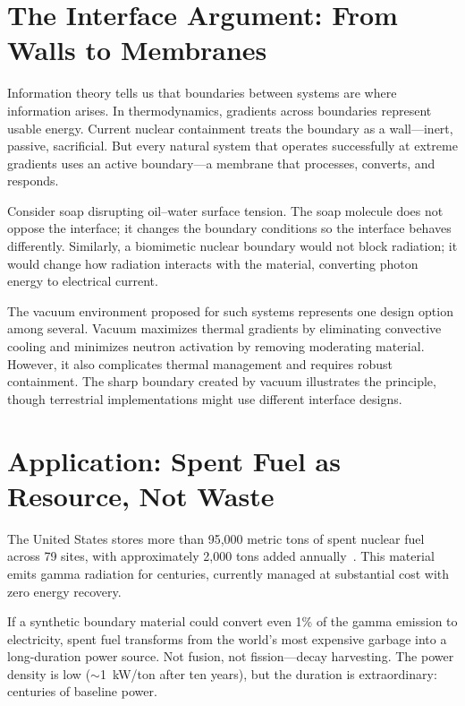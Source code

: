 \documentclass[12pt]{article}
\begin{document}
\section{The Interface Argument: From Walls to Membranes}

Information theory tells us that boundaries between systems are where information arises.
In thermodynamics, gradients across boundaries represent usable energy. Current nuclear
containment treats the boundary as a wall---inert, passive, sacrificial. But every
natural system that operates successfully at extreme gradients uses an active
boundary---a membrane that processes, converts, and responds.

Consider soap disrupting oil--water surface tension. The soap molecule does not oppose
the interface; it changes the boundary conditions so the interface behaves differently.
Similarly, a biomimetic nuclear boundary would not block radiation; it would change how
radiation interacts with the material, converting photon energy to electrical current.

The vacuum environment proposed for such systems represents one design option among
several. Vacuum maximizes thermal gradients by eliminating convective cooling and
minimizes neutron activation by removing moderating material. However, it also
complicates thermal management and requires robust containment. The sharp boundary
created by vacuum illustrates the principle, though terrestrial implementations might
use different interface designs.

\section{Application: Spent Fuel as Resource, Not Waste}

The United States stores more than 95{,}000 metric tons of spent nuclear fuel across 79
sites, with approximately 2{,}000 tons added annually~\cite{doe2025}. This material emits
gamma radiation for centuries, currently managed at substantial cost with zero energy
recovery.

If a synthetic boundary material could convert even 1\% of the gamma emission to
electricity, spent fuel transforms from the world's most expensive garbage into a
long-duration power source. Not fusion, not fission---decay harvesting. The power density
is low ($\sim$1~kW/ton after ten years), but the duration is extraordinary: centuries of
baseline power.
\end{document}
